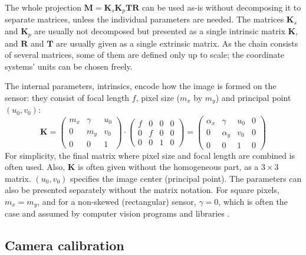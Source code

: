 The whole projection $\bm M = \bm K_s \bm K_p \bm T \bm R$ can be used as-is without decomposing it to separate matrices, unless the individual parameters are needed.
The matrices $\bm K_s$ and $\bm K_p$ are usually not decomposed but presented as a single intrinsic matrix $\bm K$, and $\bm R$ and $\bm T$ are usually given as a single extrinsic matrix.
As the chain consists of several matrices, some of them are defined only up to scale; the coordinate systems' units can be chosen freely.

The internal parameters, intrinsics, encode how the image is formed on the sensor: they consist of focal length $f$, pixel size ($m_x$ by $m_y$) and principal point $(u_0, v_0)$:
\begin{equation}
	\bm K =
	\begin{pmatrix}
		m_x & \gamma & u_0\\
		0   &    m_y & v_0\\
		0   &        0 & 1
	\end{pmatrix}
\cdot
	\begin{pmatrix}
		f & 0 & 0 & 0\\
		0 & f & 0 & 0\\
		0 & 0 & 1 & 0
	\end{pmatrix}
	=
	\begin{pmatrix}
		\alpha_x & \gamma   & u_0 & 0\\
		0        & \alpha_y & v_0 & 0\\
		0        & 0        & 1 & 0
	\end{pmatrix}
\end{equation}
For simplicity, the final matrix where pixel size and focal length are combined is often used.
Also, $\bm K$ is often given without the homogeneous part, as a $3 \times 3$ matrix.
$(u_0, v_0)$ specifies the image center (principal point).
The parameters can also be presented separately without the matrix notation.
For square pixels, $m_x = m_y$, and for a non-skewed (rectangular) sensor, $\gamma = 0$, which is often the case and assumed by computer vision programs and libraries \cite{hartley03multiview,szeliski10vision,heyden2005multiple}.



\subsection{Camera calibration} %

